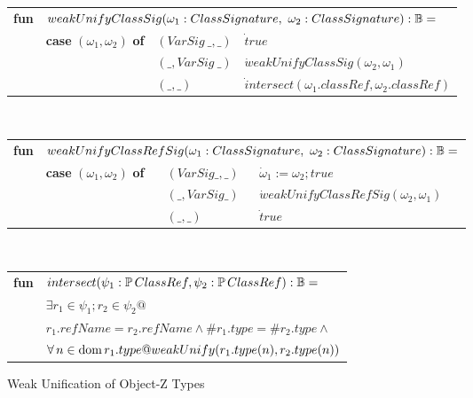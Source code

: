 \begin{figure}[!t]
\begin{tabular}{llll}
  {\bf fun} & \multicolumn{3}{l}{$weakUnifyClassSig(\omega_1:ClassSignature,~\omega_2:ClassSignature) : {\mathbb B} =$}\\
  & {\bf case} $(\omega_1,\omega_2)$ {\bf of} & $(VarSig~\_, \_ )$ & $\dot true$\\
      & & $(\_, VarSig~\_)$ & $\dot weakUnifyClassSig(\omega_2,\omega_1)$\\
      & & $(\_,\_)$ & $\dot intersect(\omega_1.classRef, \omega_2.classRef)$
\end{tabular}
\vspace{2mm}\\
\begin{tabular}{llll}
  {\bf fun} &
  \multicolumn{3}{l}{$weakUnifyClassRefSig(\omega_1:ClassSignature,~\omega_2:ClassSignature) : {\mathbb B} =$}\\
  & {\bf case} $(\omega_1,\omega_2)$ {\bf of} & $(VarSig \_, \_ )$
  & $\dot \omega_1 := \omega_2; true$\\
      & & $(\_, VarSig \_)$ & $\dot weakUnifyClassRefSig(\omega_2,\omega_1)$\\
      & & $(\_, \_)$ & $\dot true$\\
\end{tabular}
\vspace{2mm}\\
\begin{tabular}{ll}
  {\bf fun} & $intersect(\psi_1:\power ClassRef, \psi_2:\power ClassRef) : \bool =$\\
   & \quad\quad$\exists r_1 \in \psi_1; r_2 \in \psi_2 @$\\
   & \quad\quad\quad\quad $r_1.refName = r_2.refName \land \#r_1.type = \#r_2.type \land$\\
   & \quad\quad\quad\quad $\forall n \in \dom r_1.type @
       weakUnify(r_1.type(n), r_2.type(n))$
\end{tabular}
\caption{Weak Unification of Object-Z Types}
\label{weakUnify}
\end{figure}

